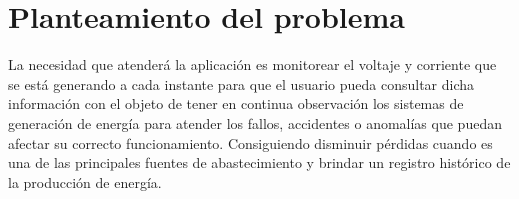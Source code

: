 
\section{Planteamiento del problema}

La necesidad que atenderá la aplicación es monitorear el voltaje y corriente que se está generando a cada instante para que el usuario pueda consultar dicha información con el objeto de tener en continua observación los sistemas de generación de energía para atender los fallos, accidentes o anomalías que puedan afectar su correcto funcionamiento. Consiguiendo disminuir pérdidas cuando es una de las principales fuentes de abastecimiento y brindar un registro histórico de la producción de energía.


